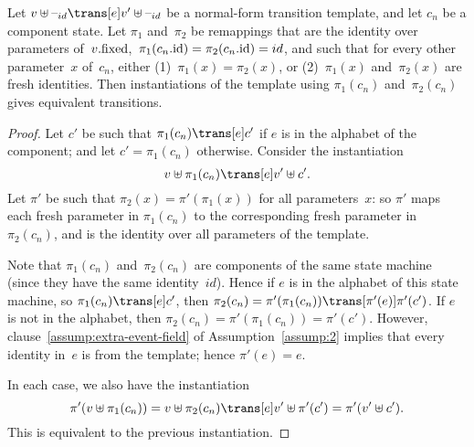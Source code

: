 



\begin{lemma}
Let $v \uplus \hole{id} \trans[e] v' \uplus \hole{id}$ be a normal-form
transition template, and let $c_n$ be a component state.  Let $\pi_1$
and~$\pi_2$ be remappings that are the identity over parameters
of~$v.\mathrm{fixed}$,\, $\pi_1(c_n.\mathrm{id}) = \pi_2(c_n.\mathrm{id}) = id$, and such that for
every other parameter~$x$ of~$c_n$, either (1)~$\pi_1(x) = \pi_2(x)$, or
(2)~$\pi_1(x)$ and~$\pi_2(x)$ are fresh identities.  Then instantiations of
the template using $\pi_1(c_n)$ and~$\pi_2(c_n)$ gives equivalent transitions.
\end{lemma}


\begin{proof}
Let $c'$ be such that $\pi_1(c_n) \trans[e] c'$ if $e$ is in the alphabet of
the component; and let $c' = \pi_1(c_n)$ otherwise.  Consider the instantiation
\[
v \uplus \pi_1(c_n) \trans[e] v' \uplus c'.
\]
Let $\pi'$ be such that $\pi_2(x) = \pi'(\pi_1(x))$ for all parameters~$x$: so
$\pi'$ maps each fresh parameter in $\pi_1(c_n)$ to the corresponding fresh
parameter in~$\pi_2(c_n)$, and is the identity over all parameters of the
template. 

Note that $\pi_1(c_n)$ and~$\pi_2(c_n)$ are components of the same state
machine (since they have the same identity~$id$).  Hence if $e$ is in the
alphabet of this state machine, so $\pi_1(c_n) \trans[e] c'$, then \(
\pi_2(c_n) = \pi'(\pi_1(c_n)) \trans[\pi'(e)] \pi'(c') \).  If $e$ is not in
the alphabet, then $\pi_2(c_n) = \pi'(\pi_1(c_n)) = \pi'(c')$.  However,
clause~\ref{assump:extra-event-field} of Assumption~\ref{assump:2} implies
that every identity in~$e$ is from the template; hence $\pi'(e) = e$.

In each case, we also have the instantiation
\[
\pi'(v \uplus \pi_1(c_n)) =
v \uplus \pi_2(c_n) \trans[e] v' \uplus \pi'(c') = \pi'(v' \uplus c').
\]
This is equivalent to the previous instantiation. 
\end{proof}


